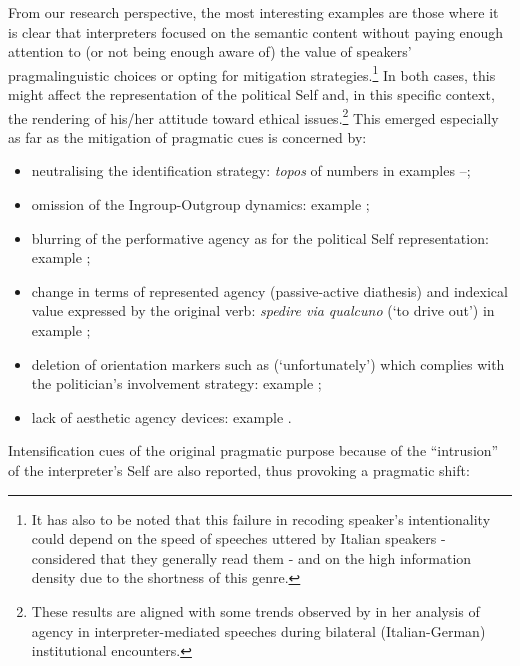 \documentclass[output=paper]{langscibook}
\begin{document}
\begin{sloppypar}
From our research perspective, the most interesting examples are those where it is clear that interpreters focused on the semantic content without paying enough attention to (or not being enough aware of) the value of speakers’ pragmalinguistic choices or opting for mitigation strategies.\footnote{It has also to be noted that this failure in recoding speaker’s intentionality could depend on the speed of speeches uttered by Italian speakers - considered that they generally read them - and on the high information density due to the shortness of this genre.} In both cases, this might affect the representation of the political Self and, in this specific context, the rendering of his/her attitude toward ethical issues.\footnote{These results are aligned with some trends observed by \citet{Coppola2019} in her analysis of agency in interpreter-mediated speeches during bilateral (Italian-German) institutional encounters.} This emerged especially as far as the mitigation of pragmatic cues is concerned by:
\end{sloppypar}

\begin{itemize}
\item neutralising the identification strategy: \textit{topos} of numbers in examples --;
\item omission of the Ingroup-Outgroup dynamics: example ;
\item blurring of the performative agency as for the political Self representation: example ;
\item change in terms of represented agency (passive-active diathesis) and indexical value expressed by the original verb: \textit{spedire via qualcuno} (‘to drive out’) in example ;
\item deletion of orientation markers such as  (‘unfortunately’) which complies with the politician’s involvement strategy: example ;
\item lack of aesthetic agency devices: example .
\end{itemize}

Intensification cues of the original pragmatic purpose because of the “intrusion” of the interpreter’s Self are also reported, thus provoking a pragmatic shift:
\end{document}
